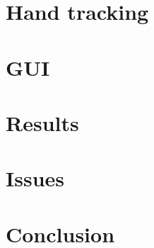\documentclass[conference]{IEEEtran}
\begin{document}
    \section{Hand tracking}\label{sec:hand_tracking}
    

    \section{GUI}\label{sec:gui}
    

    \section{Results}\label{sec:results}
    

    \section{Issues}\label{sec:issues}
    

    \section{Conclusion}\label{sec:conclusion}
    

    
\end{document}
